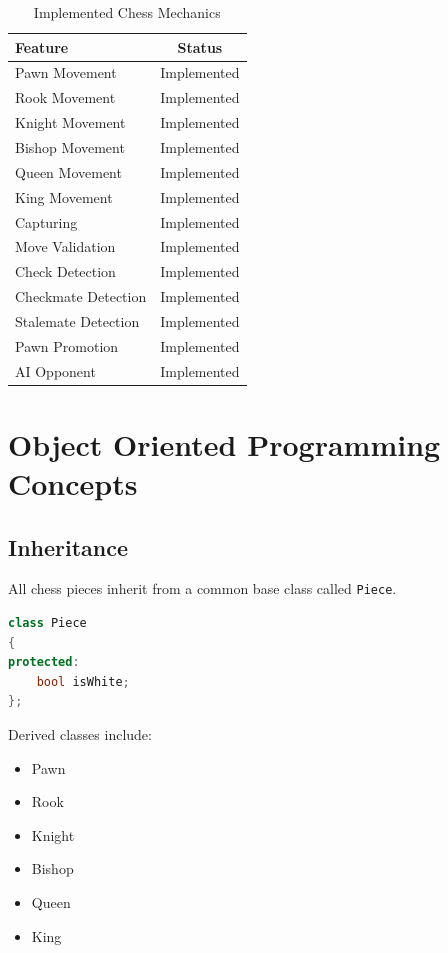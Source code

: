 \documentclass[11pt]{article}
\begin{document}
\begin{table}[H]
\centering
\begin{tabular}{|l|c|}
\hline
\textbf{Feature} & \textbf{Status} \\
\hline
Pawn Movement & Implemented \\
Rook Movement & Implemented \\
Knight Movement & Implemented \\
Bishop Movement & Implemented \\
Queen Movement & Implemented \\
King Movement & Implemented \\
Capturing & Implemented \\
Move Validation & Implemented \\
Check Detection & Implemented \\
Checkmate Detection & Implemented \\
Stalemate Detection & Implemented \\
Pawn Promotion & Implemented \\
AI Opponent & Implemented \\
\hline
\end{tabular}
\caption{Implemented Chess Mechanics}
\end{table}


\section{Object Oriented Programming Concepts}

\subsection{Inheritance}

All chess pieces inherit from a common base class called \texttt{Piece}.

\begin{lstlisting}[language=C++]
class Piece
{
protected:
    bool isWhite;
};
\end{lstlisting}

Derived classes include:

\begin{itemize}
    \item Pawn
    \item Rook
    \item Knight
    \item Bishop
    \item Queen
    \item King
\end{itemize}
\end{document}
